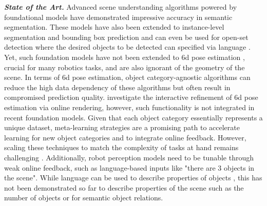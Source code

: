 \documentclass{erc-B2}
\begin{document}
\textit{\textbf{State of the Art.}}
Advanced scene understanding algorithms powered by foundational models \cite{SAM,DINOv2} have demonstrated impressive accuracy in semantic segmentation. These models have also been extended to instance-level segmentation and bounding box prediction \cite{liu2023grounding,SAM} and can even be used for open-set detection where the desired objects to be detected can specified via language \cite{liu2023grounding}. Yet, such foundation models have not been extended to \gls*{6d} pose estimation \cite{FFB6D, pvn3d, DuffhaussRAL}, crucial for many robotics tasks, and are also ignorant of the geometry of the scene. In terms of \gls*{6d} pose estimation, object category-agnostic algorithms \cite{liu2022gen6d,gao2023sad} can reduce the high data dependency \cite{FFB6D, pvn3d, DuffhaussRAL} of these algorithms but often result in compromised prediction quality. %
\cite{Inerf,RePOSE,chen2020category} investigate the interactive refinement of \gls*{6d} pose estimation via online rendering, however, such functionality is not integrated in recent foundation models. %
Given that each object category essentially represents a unique dataset, meta-learning strategies \cite{finn2017model,Gao_2022_CVPR,volpp2021bayesian} are a promising path to accelerate learning for new object categories and to integrate online feedback. However, scaling these techniques to match the complexity of tasks at hand remains challenging \cite{Gao_2022_CVPR}. %
Additionally, robot perception models need to be tunable through weak online feedback, such as language-based inputs like "there are 3 objects in the scene". While language can be used to describe properties of objects \cite{liu2023grounding}, this has not been demonstrated so far to describe properties of the scene such as the number of objects or for semantic object relations. 

\end{document}
